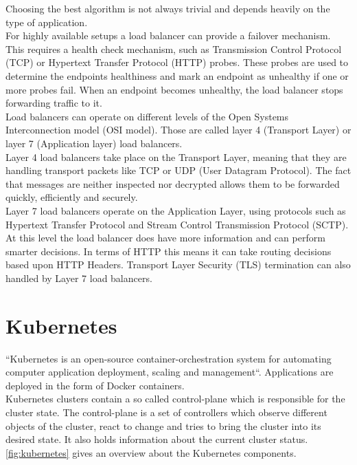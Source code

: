 Choosing the best algorithm is not always trivial and depends heavily on the type of application.~\cite{ALLEN-LOAD-BALANCING}
\\
For highly available setups a load balancer can provide a failover mechanism.
This requires a health check mechanism, such as Transmission Control Protocol (TCP) or Hypertext Transfer Protocol (HTTP) probes.
These probes are used to determine the endpoints healthiness and mark an endpoint as unhealthy if one or more probes fail.
When an endpoint becomes unhealthy, the load balancer stops forwarding traffic to it.
\\
Load balancers can operate on different levels of the Open Systems Interconnection model (OSI model).
Those are called layer 4 (Transport Layer) or layer 7 (Application layer) load balancers.
\\
Layer 4 load balancers take place on the Transport Layer, meaning that they are handling transport packets like TCP or UDP (User Datagram Protocol).
The fact that messages are neither inspected nor decrypted allows them to be forwarded quickly, efficiently and securely.
\\
Layer 7 load balancers operate on the Application Layer, using protocols such as Hypertext Transfer Protocol and Stream Control Transmission Protocol (SCTP).
At this level the load balancer does have more information and can perform smarter decisions.
In terms of HTTP this means it can take routing decisions based upon HTTP Headers.
Transport Layer Security (TLS) termination can also handled by Layer 7 load balancers.~\cite{NICHOLSON-LOAD-BALANCING}

\section{Kubernetes}
``Kubernetes is an open-source container-orchestration system for automating computer application deployment, scaling and management``\cite{Kubernetes}.
Applications are deployed in the form of Docker containers.
\\
Kubernetes clusters contain a so called control-plane which is responsible for the cluster state.
The control-plane is a set of controllers which observe different objects of the cluster, react to change and tries to bring the cluster into its desired state.
It also holds information about the current cluster status.
\autoref{fig:kubernetes} gives an overview about the Kubernetes components.

